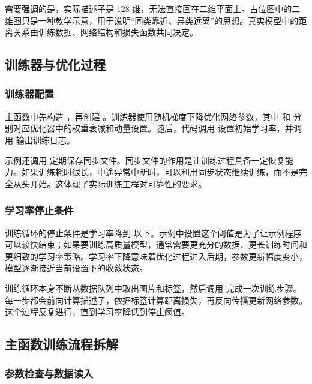 需要强调的是，实际描述子是 128 维，无法直接画在二维平面上。占位图中的二维图只是一种教学示意，用于说明“同类靠近、异类远离”的思想。真实模型中的距离关系由训练数据、网络结构和损失函数共同决定。

\subsection{训练器与优化过程}

\subsubsection{训练器配置}

主函数中先构造 ，再创建 。训练器使用随机梯度下降优化网络参数，其中  和  分别对应优化器中的权重衰减和动量设置。随后，代码调用  设置初始学习率，并调用  输出训练日志。

示例还调用  定期保存同步文件。同步文件的作用是让训练过程具备一定恢复能力。如果训练耗时很长，中途异常中断时，可以利用同步状态继续训练，而不是完全从头开始。这体现了实际训练工程对可靠性的要求。

\subsubsection{学习率停止条件}

训练循环的停止条件是学习率降到  以下。示例中设置这个阈值是为了让示例程序可以较快结束；如果要训练高质量模型，通常需要更充分的数据、更长训练时间和更细致的学习率策略。学习率下降意味着优化过程进入后期，参数更新幅度变小，模型逐渐接近当前设置下的收敛状态。

训练循环本身不断从数据队列中取出图片和标签，然后调用  完成一次训练步骤。每一步都会前向计算描述子，依据标签计算距离损失，再反向传播更新网络参数。这个过程反复进行，直到学习率降低到停止阈值。

\subsection{主函数训练流程拆解}

\subsubsection{参数检查与数据读入}

